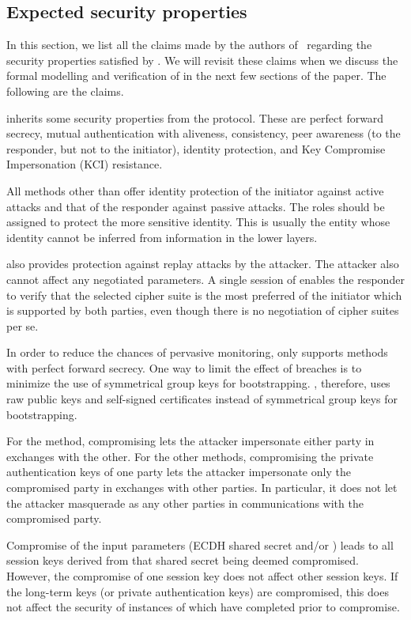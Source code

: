 \subsection{Expected security properties}
In this section, we list all the claims made by the authors of~\cite{selander-lake-edhoc-01} regarding the security properties satisfied by \mEdhoc. We will revisit these claims when we discuss the formal modelling and verification of \mEdhoc in the next few sections of the paper. The following are the claims.

\mEdhoc inherits some security properties from the \mSigmaI protocol. These are perfect forward secrecy, mutual authentication with aliveness, consistency, peer awareness (to the responder, but not to the initiator), identity protection, and Key Compromise Impersonation (KCI) resistance.

All methods other than \mPskPsk offer identity protection of the initiator against active attacks and that of the responder against passive attacks. The roles should be assigned to protect the more sensitive identity. This is usually the entity whose identity cannot be inferred from information in the lower layers.

\mEdhoc also provides protection against replay attacks by the attacker. The attacker also cannot affect any negotiated parameters. A single session of \mEdhoc enables the responder to verify that the selected cipher suite is the most preferred of the initiator which is supported by both parties, even though there is no negotiation of cipher suites per se.

In order to reduce the chances of pervasive monitoring, \mEdhoc only supports methods with perfect forward secrecy. One way to limit the effect of breaches is to minimize the use of symmetrical group keys for bootstrapping. \mEdhoc, therefore, uses raw public keys and self-signed certificates instead of symmetrical group keys for bootstrapping.

For the \mPskPsk method, compromising \mPsk lets the attacker impersonate either party in \mEdhoc exchanges with the other. For the other methods, compromising the private authentication keys of one party lets the attacker impersonate only the compromised party in exchanges with other parties. In particular, it does not let the attacker masquerade as any other parties in communications with the compromised party. 

Compromise of the \mHkdf input parameters (ECDH shared secret and/or \mPsk) leads to all session keys derived from that shared secret being deemed compromised. However, the compromise of one session key does not affect other session keys. If the long-term keys (\mPsk or private authentication keys) are compromised, this does not affect the security of instances of \mEdhoc which have completed prior to compromise. 


